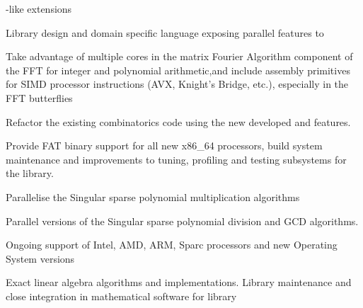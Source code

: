\begin{workpackage}
\begin{wpdelivs}
\begin{wpdeliv}[due=18,id=GAP-hpc-report,dissem=PU,nature=R,lead=SA]
{      \Cython-like extensions }
  \end{wpdeliv}
  \begin{wpdeliv}[due=24,id=LinBox-DSL,dissem=PU,nature=R,lead=UJF]
    {Library design and domain specific language exposing \Linbox parallel features to \Sage}
  \end{wpdeliv}
  \begin{wpdeliv}[due=24,id=FFT,dissem=PU,nature=DEM, lead=UK]
    {Take advantage of multiple cores in the matrix Fourier Algorithm component of the FFT
      for integer and polynomial arithmetic,and include assembly primitives for SIMD
      processor instructions (AVX, Knight's Bridge, etc.), especially in the FFT
      butterflies}
\end{wpdeliv}
  \begin{wpdeliv}[due=36,id=sage-HPCcombi,dissem=PU,nature=DEM,lead=PS]
      {Refactor the existing combinatorics \Sage code using the new developed \Pythran and \Cython features.}
  \end{wpdeliv}
  \begin{wpdeliv}[due=24,id=MPIRfat,dissem=PU,nature=DEM,lead=UK]
      {Provide FAT binary support for all new x86\_64 processors, build system
        maintenance and improvements to tuning, profiling and testing subsystems
      for the \MPIR library.}
\end{wpdeliv}
  \begin{wpdeliv}[due=36,id=singular-polymul,dissem=PU,nature=DEM,lead=UK]
      {Parallelise the Singular sparse polynomial multiplication algorithms}
\end{wpdeliv}
  \begin{wpdeliv}[due=48,id=singular-polyarith,dissem=PU,nature=DEM, lead=UK]
      {Parallel versions of the Singular sparse polynomial division and GCD algorithms.}
\end{wpdeliv}
  \begin{wpdeliv}[due=48,id=MPIRprocessors,dissem=PU,nature=DEM,lead=UK]
      {Ongoing support of Intel, AMD, ARM, Sparc processors and new Operating System versions}
  \end{wpdeliv}
  \begin{wpdeliv}[due=36,id=LinBox-algo,dissem=PU,nature=DEM, lead=UJF]
    {Exact linear algebra algorithms and implementations. Library maintenance and close integration
      in mathematical software for \Linbox library}
  \end{wpdeliv}
  \begin{wpdeliv}[due=47,id=GAP-software-final,dissem=PU,nature=OTHER,lead=SA]

\end{wpdeliv}
\end{wpdelivs}
\end{workpackage}
